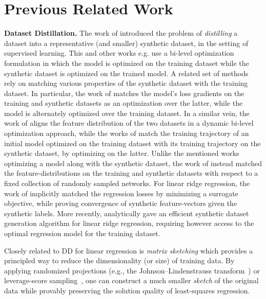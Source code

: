 \section{Previous Related Work}
{\bf Dataset Distillation.} The work of \cite{Wangetal18} introduced the problem of \emph{distilling} a dataset into a representative (and smaller) synthetic dataset, in the setting of supervised learning. This and other works e.g. \cite{deng2022remember} use a bi-level optimization formulation in which the model is optimized on the training dataset while the synthetic dataset is optimized on the trained model. A related set of methods rely on matching various properties of the synthetic dataset with the training dataset. In particular, the work of \cite{zhao2021dataset,Zhao2021DatasetCW} matches the model's loss gradients on the training and synthetic datasets as an optimization over the latter, while the model is alternately optimized over the training dataset. In a similar vein, the work of \cite{Wangetal22} aligns the feature distribution of the two datasets in a dynamic bi-level optimization approach, while the works of \cite{Cazenavetteetal22,Cuietal23} match the training trajectory of an initial model optimized on the training dataset with its training trajectory on the synthetic dataset, by optimizing on the latter. Unlike the mentioned works optimizing a model along with the synthetic dataset, the work of \cite{ZBDistribMatch} instead matched the feature-distributions on the training and synthetic datasets with respect to a fixed collection of randomly sampled networks. For linear ridge regression, the work of \cite{nguyen2021dataset} implicitly matched the regression losses by minimizing a surrogate objective, while proving convergence of synthetic feature-vectors given the synthetic labels. More recently, \cite{chen2024provable} analytically gave an efficient synthetic dataset generation algorithm for linear ridge regression, requiring however access to the optimal regression model for the training dataset.


Closely related to DD for linear regression is \emph{matrix sketching} which  provides a principled way to reduce the dimensionality (or size) of training data. By applying randomized projections (e.g., the Johnson--Lindenstrauss transform~\citep{johnson1984extensions,sarlos2006improved}) or leverage-score sampling~\citep{drineas2006fast,mahoney2011randomized}, one can construct a much smaller \emph{sketch} of the original data while provably preserving the solution quality of least-squares regression. 

